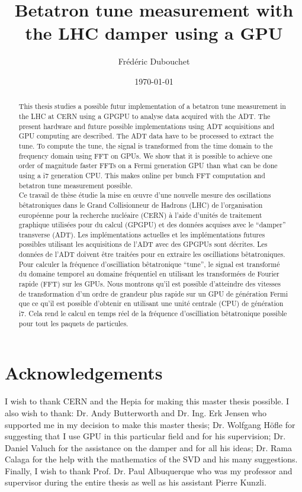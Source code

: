 \documentclass[a4paper]{report}
\title{Betatron tune measurement with the LHC damper using a GPU}
\author{Fr{\'e}d{\'e}ric Dubouchet}
\date{\today}
\begin{document}


\begin{abstract}
  This thesis studies a possible futur implementation of a betatron tune measurement in the \gls{LHC} at \gls{CERN} using a \gls{GPGPU} to analyse data acquired with the \gls{ADT}. The present hardware and future possible implementations using \gls{ADT} acquisitions and \gls{GPU} computing are described. The \gls{ADT} data have to be processed to extract the \gls{tune}. To compute the tune, the signal is transformed from the time domain to the frequency domain using \gls{FFT} on \glspl{GPU}. We show that it is possible to achieve one order of magnitude faster \glspl{FFT} on a Fermi generation \gls{GPU} than what can be done using a i7 generation \gls{CPU}. This makes online per \gls{bunch} \gls{FFT} computation and betatron tune measurement possible.\\[2cm]

  Ce travail de th{\`e}se {\'e}tudie la mise en {\oe}uvre d'une nouvelle mesure des oscillations b{\^e}tatroniques dans le Grand Collisionneur de Hadrons (LHC) de l'organisation europ{\'e}enne pour la recherche nucléaire (CERN) {\`a} l'aide d'unit{\'e}s de traitement graphique utilis{\'e}es pour du calcul (GPGPU) et des donn{\'e}es acquises avec le ``damper'' transverse (ADT). Les impl{\'e}mentations actuelles et les impl{\'e}mentations futures possibles utilisant les acquisitions de l'ADT avec des GPGPUs sont d{\'e}crites. Les données de l'ADT doivent {\^e}tre trait{\'e}es pour en extraire les oscilliations b{\^e}tatroniques. Pour calculer la fr{\'e}quence d'oscilliation b{\^e}tatronique ``tune'', le signal est transform{\'e} du domaine temporel au domaine fr{\'e}quentiel en utilisant les transformées de Fourier rapide (FFT) sur les GPUs. Nous montrons qu'il est possible d'atteindre des vitesses de transformation d'un ordre de grandeur plus rapide sur un GPU de g{\'e}n{\'e}ration Fermi que ce qu'il est possible d'obtenir en utilisant une unit{\'e} centrale (CPU) de g{\'e}n{\'e}ration i7. Cela rend le calcul en temps r{\'e}el de la fr{\'e}quence d'oscilliation b{\^e}tatronique possible pour tout les paquets de particules.
\end{abstract}

\chapter*{Acknowledgements}

I wish to thank \gls{CERN} and the \gls{Hepia} for making this master thesis possible. I also wish to thank: Dr. Andy Butterworth and Dr. Ing. Erk Jensen who supported me in my decision to make this master thesis; Dr. Wolfgang H{\"o}fle for suggesting that I use GPU in this particular field and for his supervision; Dr. Daniel Valuch for the assistance on the damper and for all his ideas; Dr. Rama Calaga for the help with the mathematics of the \gls{SVD} and his many suggestions. Finally, I wish to thank Prof. Dr. Paul Albuquerque who was my professor and supervisor during the entire thesis as well as his assistant Pierre Kunzli.

\tableofcontents
\listoffigures
\listoftables









\printglossaries


\end{document}
